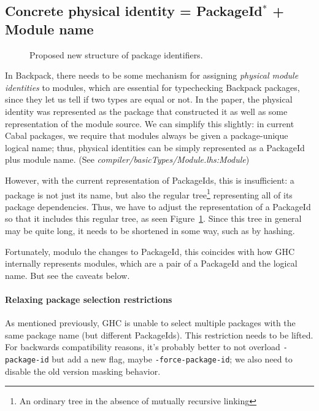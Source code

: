 \documentclass{article}
\newcommand{\ghcfile}[1]{\textsl{#1}}
\begin{document}
\subsection{Concrete physical identity = PackageId$^*$ + Module name}\label{sec:ipi}

\begin{figure}
\label{fig:proposed-pkgid}\caption{Proposed new structure of package identifiers.}
\end{figure}

In Backpack, there needs to be some mechanism for assigning
\emph{physical module identities} to modules, which are essential for
typechecking Backpack packages, since they let us tell if two types are
equal or not. In the paper, the physical identity was represented as the
package that constructed it as well as some representation of the module
source.  We can simplify this slightly: in current Cabal packages, we
require that modules always be given a package-unique logical name;
thus, physical identities can be simply represented as a PackageId plus
module name. (See \ghcfile{compiler/basicTypes/Module.lhs:Module})

However, with the current representation of PackageIds, this is
insufficient: a package is not just its name, but also the regular
tree\footnote{An ordinary tree in the absence of mutually recursive linking}
representing all of its package dependencies.  Thus, we have
to adjust the representation of a PackageId so that it includes this
regular tree, as seen Figure~\ref{fig:proposed-pkgid}.  Since this
tree in general may be quite long, it needs to be shortened in some way,
such as by hashing.

Fortunately, modulo the changes to PackageId, this coincides with how
GHC internally represents modules, which are a pair of a PackageId and the
logical name.  But see the caveats below.

\paragraph{Relaxing package selection restrictions}  As mentioned
previously, GHC is unable to select multiple packages with the same
package name (but different PackageIds).  This restriction needs to be
lifted.  For backwards compatibility reasons, it's probably better to
not overload \verb|-package-id| but add a new flag, maybe \verb|-force-package-id|;
we also need to disable the old version masking behavior.
\end{document}

